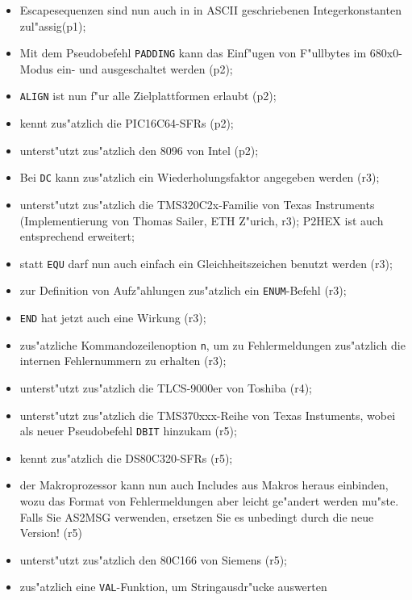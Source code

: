 \documentclass[12pt,a4paper,twoside]{report}
\newcommand{\tty}[1]{{\tt #1}}
\begin{document}
\begin{itemize}
{\begin{itemize}
{            abgeschaltet werden(p1);}
      \item{Escapesequenzen sind nun auch in in ASCII geschriebenen
            Integerkonstanten zul"assig(p1);}
      \item{Mit dem Pseudobefehl \tty{PADDING} kann das Einf"ugen
            von F"ullbytes im 680x0-Modus ein- und ausgeschaltet
            werden (p2);}
      \item{\tty{ALIGN} ist nun f"ur alle Zielplattformen erlaubt (p2);}
      \item{kennt zus"atzlich die PIC16C64-SFRs (p2);}
      \item{unterst"utzt zus"atzlich den 8096 von Intel (p2);}
      \item{Bei \tty{DC} kann zus"atzlich ein Wiederholungsfaktor angegeben
            werden (r3);}
      \item{unterst"utzt zus"atzlich die TMS320C2x-Familie von Texas
            Instruments (Implementierung von Thomas Sailer, ETH Z"urich,
            r3); P2HEX ist auch entsprechend erweitert;}
      \item{statt \tty{EQU} darf nun auch einfach ein Gleichheitszeichen
            benutzt werden (r3);}
      \item{zur Definition von Aufz"ahlungen zus"atzlich ein
            \tty{ENUM}-Befehl (r3);}
      \item{\tty{END} hat jetzt auch eine Wirkung (r3);}
      \item{zus"atzliche Kommandozeilenoption \tty{n}, um zu Fehlermeldungen
            zus"atzlich die internen Fehlernummern zu erhalten (r3);}
      \item{unterst"utzt zus"atzlich die TLCS-9000er von Toshiba (r4)};
      \item{unterst"utzt zus"atzlich die TMS370xxx-Reihe von Texas
            Instuments, wobei als neuer Pseudobefehl \tty{DBIT}
            hinzukam (r5);}
      \item{kennt zus"atzlich die DS80C320-SFRs (r5);}
      \item{der Makroprozessor kann nun auch Includes aus Makros
            heraus einbinden, wozu das Format von Fehlermeldungen
            aber leicht ge"andert werden mu"ste.  Falls Sie AS2MSG
            verwenden, ersetzen Sie es unbedingt durch die neue
            Version! (r5)}
      \item{unterst"utzt zus"atzlich den 80C166 von Siemens (r5);}
      \item{zus"atzlich eine \tty{VAL}-Funktion, um Stringausdr"ucke auswerten
}
\end{itemize}}
\end{itemize}
\end{document}
